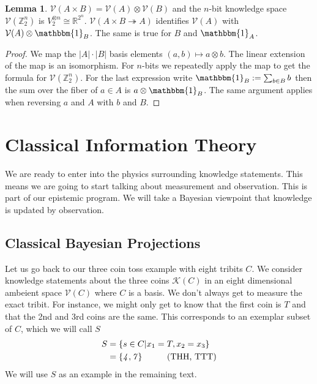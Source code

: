 \documentclass[12pt,a4paper]{article}
\theoremstyle{myrule}
\theoremstyle{postulate}
\theoremstyle{definition}
\newtheorem{lemma}[theorem]{Lemma}
\begin{document}
\begin{lemma}
\label{product}
  $\mathcal{V}(A \times B) = \mathcal{V}(A) \otimes \mathcal{V}(B)$ and the $n$-bit knowledge space $\mathcal{V}(\mathbb{Z}_2^n)$ is $V_2 ^ {\otimes n} \cong \mathbb{R}^{2^n}$.  $\mathcal{V}(A \times B \twoheadrightarrow A)$ identifies $\mathcal{V}(A)$ with $\mathcal{V}(A) \otimes \mathbbm{1}_B$.  The same is true for $B$ and $\mathbbm{1}_A$.
\end{lemma}
\begin{proof}
  We map the $|A|\cdot|B|$ basis elements $(a,b) \mapsto a \otimes b$.  The linear extension of the map is an isomorphism.  For $n$-bits we repeatedly apply the map to get the formula for $\mathcal{V}(\mathbb{Z}_2^n)$.  For the last expression write $\mathbbm{1}_B := \sum_{b \in B} b$ then the sum over the fiber of $a \in A$ is $a \otimes \mathbbm{1}_B$.  The same argument applies when reversing $a$ and $A$ with $b$ and $B$.
\end{proof}

\section{Classical Information Theory}
\label{physicsstart}
We are ready to enter into the physics surrounding knowledge statements.  This means we are going to start talking about measurement and observation.  This is part of our epistemic program.  We will take a Bayesian viewpoint that knowledge is updated by observation.

\subsection{Classical Bayesian Projections}
\label{proj}
Let us go back to our three coin toss example with eight tribits $C$.   We consider knowledge statements about the three coins $\mathcal{K}(C)$ in an eight dimensional ambeient space $\mathcal{V}(C)$ where $C$ is a basis.  We don't always get to measure the exact tribit.  For instance, we might only get to know that the first coin is $T$ and that the 2nd and 3rd coins are the same.  This corresponds to an exemplar subset of $C$, which we will call $S$
\[
\begin{split}
  S &= \{s \in C | x_1 = T, x_2 = x_3 \} \\
    & = \{\mathit{4},\mathit{7}\} \hspace{0.4 in} \text{(THH, TTT)}
\end{split}
\]
We will use $S$ as an example in the remaining text.
\end{document}
